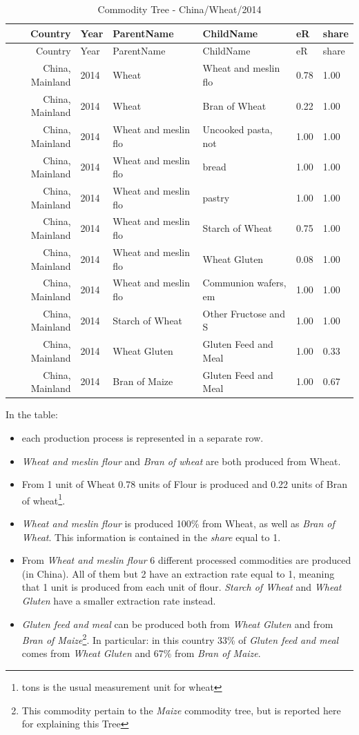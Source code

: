 \documentclass[]{article}
\providecommand{\tightlist}{%
  \setlength{\itemsep}{0pt}\setlength{\parskip}{0pt}}
\let\rmarkdownfootnote\footnote%
\def\footnote{\protect\rmarkdownfootnote}
\begin{document}
\begin{longtable}[]{@{}rlllll@{}}
\caption{Commodity Tree - China/Wheat/2014}\tabularnewline
\toprule
Country & Year & ParentName & ChildName & eR & share\tabularnewline
\midrule
\endfirsthead
\toprule
Country & Year & ParentName & ChildName & eR & share\tabularnewline
\midrule
\endhead
China, Mainland & 2014 & Wheat & Wheat and meslin flo & 0.78 &
1.00\tabularnewline
China, Mainland & 2014 & Wheat & Bran of Wheat & 0.22 &
1.00\tabularnewline
China, Mainland & 2014 & Wheat and meslin flo & Uncooked pasta, not &
1.00 & 1.00\tabularnewline
China, Mainland & 2014 & Wheat and meslin flo & bread & 1.00 &
1.00\tabularnewline
China, Mainland & 2014 & Wheat and meslin flo & pastry & 1.00 &
1.00\tabularnewline
China, Mainland & 2014 & Wheat and meslin flo & Starch of Wheat & 0.75 &
1.00\tabularnewline
China, Mainland & 2014 & Wheat and meslin flo & Wheat Gluten & 0.08 &
1.00\tabularnewline
China, Mainland & 2014 & Wheat and meslin flo & Communion wafers, em &
1.00 & 1.00\tabularnewline
China, Mainland & 2014 & Starch of Wheat & Other Fructose and S & 1.00 &
1.00\tabularnewline
China, Mainland & 2014 & Wheat Gluten & Gluten Feed and Meal & 1.00 &
0.33\tabularnewline
China, Mainland & 2014 & Bran of Maize & Gluten Feed and Meal & 1.00 &
0.67\tabularnewline
\bottomrule
\end{longtable}

In the table:

\begin{itemize}
\tightlist
\item
  each production process is represented in a separate row.
\item
  \emph{Wheat and meslin flour} and \emph{Bran of wheat} are both
  produced from Wheat.
\item
  From 1 unit of Wheat 0.78 units of Flour is produced and 0.22 units of
  Bran of wheat\footnote{tons is the usual measurement unit for wheat}.
\item
  \emph{Wheat and meslin flour} is produced 100\% from Wheat, as well as
  \emph{Bran of Wheat}. This information is contained in the
  \emph{share} equal to 1.
\item
  From \emph{Wheat and meslin flour} 6 different processed commodities
  are produced (in China). All of them but 2 have an extraction rate
  equal to 1, meaning that 1 unit is produced from each unit of flour.
  \emph{Starch of Wheat} and \emph{Wheat Gluten} have a smaller
  extraction rate instead.
\item
  \emph{Gluten feed and meal} can be produced both from \emph{Wheat
  Gluten} and from \emph{Bran of Maize}\footnote{This commodity pertain
    to the \emph{Maize} commodity tree, but is reported here for
    explaining this Tree}. In particular: in this country 33\% of
  \emph{Gluten feed and meal} comes from \emph{Wheat Gluten} and 67\%
  from \emph{Bran of Maize}.
\end{itemize}
\end{document}
